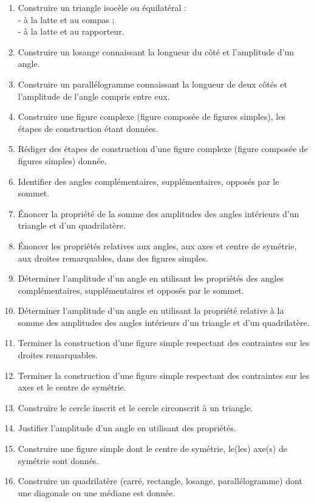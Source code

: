 \documentclass[../../syllabus_1.tex]{subfiles}
\begin{document}
\begin{enumerate}[label=\textbf{\arabic*.}]
    - la longueur de deux côtés et l'amplitude de l'angle compris entre eux ;
    - la longueur des trois côtés.
    \item Construire un triangle isocèle ou équilatéral :\\
    - à la latte et au compas ;\\
    - à la latte et au rapporteur.
    \item Construire un losange connaissant la longueur du côté et l'amplitude d'un angle.
    \item Construire un parallélogramme connaissant la longueur de deux côtés et l'amplitude de l'angle compris entre eux.
    \item Construire une figure complexe (figure composée de figures simples), les étapes de construction étant données.
    \item Rédiger des étapes de construction d'une figure complexe (figure composée de figures simples) donnée.
    \item Identifier des angles complémentaires, supplémentaires, opposés par le sommet.
    \item Énoncer la propriété de la somme des amplitudes des angles intérieurs d'un triangle et d'un quadrilatère.
    \item Énoncer les propriétés relatives aux angles, aux axes et centre de symétrie, aux droites remarquables, dans des figures simples.
    \item Déterminer l'amplitude d'un angle en utilisant les propriétés des angles complémentaires, supplémentaires et opposés par le sommet.
    \item Déterminer l'amplitude d'un angle en utilisant la propriété relative à la somme des amplitudes des angles intérieurs d'un triangle et d'un quadrilatère.
    \item Terminer la construction d'une figure simple respectant des contraintes sur les droites remarquables.
    \item Terminer la construction d'une figure simple respectant des contraintes sur les axes et le centre de symétrie.
    \item Construire le cercle inscrit et le cercle circonscrit à un triangle.
    \item Justifier l'amplitude d'un angle en utilisant des propriétés.
    \item Construire une figure simple dont le centre de symétrie, le(les) axe(s) de symétrie sont donnés.
    \item Construire un quadrilatère (carré, rectangle, losange, parallélogramme) dont une diagonale ou une médiane est donnée.

\end{enumerate}
\end{document}

